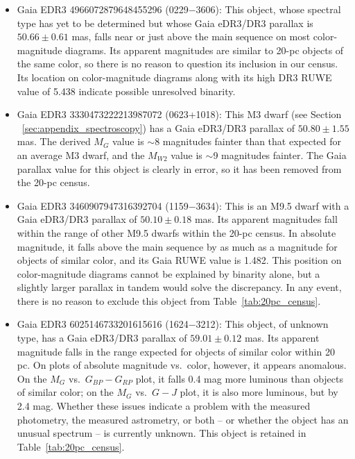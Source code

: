 \documentclass[twocolumn,tighten,twocolappendix]{aastex631}
\begin{document}
\begin{itemize}

\item Gaia EDR3 4966072879648455296 (0229$-$3606): This object, whose spectral type has yet to be determined but whose Gaia eDR3/DR3 parallax is $50.66{\pm}0.61$ mas, falls near or just above the main sequence on most color-magnitude diagrams. Its apparent magnitudes are similar to 20-pc objects of the same color, so there is no reason to question its inclusion in our census. Its location on color-magnitude diagrams along with its high DR3 RUWE value of 5.438 indicate possible unresolved binarity.

\item Gaia EDR3 3330473222213987072 (0623+1018): This M3 dwarf (see Section ~\ref{sec:appendix_spectroscopy}) has a Gaia eDR3/DR3 parallax of $50.80{\pm}1.55$ mas. The derived $M_G$ value is $\sim$8 magnitudes fainter than that expected for an average M3 dwarf, and the $M_{W2}$ value is $\sim$9 magnitudes fainter. The Gaia parallax value for this object is clearly in error, so it has been removed from the 20-pc census.

\item Gaia EDR3 3460907947316392704 (1159$-$3634): This is an M9.5 dwarf with a Gaia eDR3/DR3 parallax of $50.10{\pm}0.18$ mas. Its apparent magnitudes fall within the range of other M9.5 dwarfs within the 20-pc census. In absolute magnitude, it falls above the main sequence by as much as a magnitude for objects of similar color, and its Gaia RUWE value is 1.482. This position on color-magnitude diagrams cannot be explained by binarity alone, but a slightly larger parallax in tandem would solve the discrepancy. In any event, there is no reason to exclude this object from Table~\ref{tab:20pc_census}.

\item Gaia EDR3 6025146733201615616 (1624$-$3212): This object, of unknown type, has a Gaia eDR3/DR3 parallax of $59.01{\pm}0.12$ mas. Its apparent magnitude falls in the range expected for objects of similar color within 20 pc. On plots of absolute magnitude vs.\ color, however, it appears anomalous. On the $M_G$ vs.\ $G_{BP}-G_{RP}$ plot, it falls 0.4 mag more luminous than objects of similar color; on the $M_G$ vs.\ $G-J$ plot, it is also more luminous, but by 2.4 mag. Whether these issues indicate a problem with the measured photometry, the measured astrometry, or both -- or whether the object has an unusual spectrum -- is currently unknown. This object is retained in Table~\ref{tab:20pc_census}.


\end{itemize}
\end{document}
